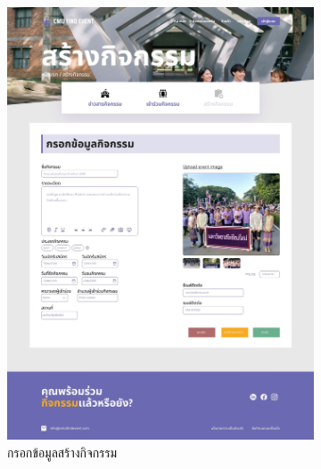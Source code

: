\begin{figure}[h]
  \centering
  \begin{subfigure}[b]{0.3\linewidth}
    \includegraphics[width=\linewidth]{image/Figma-design/Create-event-info.jpg}
    \caption{กรอกข้อมูลสร้างกิจกรรม}
  \end{subfigure}
  \hfill
  \begin{subfigure}[b]{0.3\linewidth}

\end{subfigure}
\end{figure}
